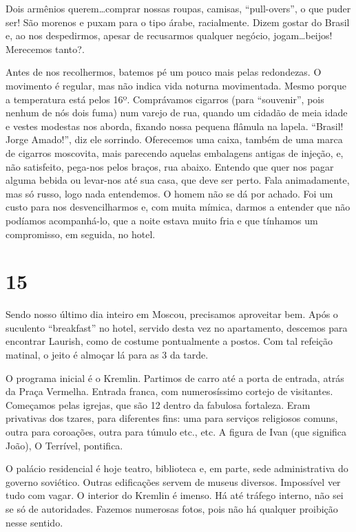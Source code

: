 Dois armênios querem\ldots comprar nossas roupas, camisas, ``pull-overs'', o que puder ser! São morenos e puxam para o tipo árabe, racialmente. Dizem gostar do Brasil e, ao nos despedirmos, apesar de recusarmos qualquer negócio, jogam\ldots beijos! Merecemos tanto?.

Antes de nos recolhermos, batemos pé um pouco mais pelas redondezas. O movimento é regular, mas não indica vida noturna movimentada. Mesmo porque a temperatura está pelos 16º. Comprávamos cigarros (para ``souvenir'', pois nenhum de nós dois fuma) num varejo de rua, quando um cidadão de meia idade e vestes modestas nos aborda, fixando nossa pequena flâmula na lapela. ``Brasil! Jorge Amado!'', diz ele sorrindo. Oferecemos uma caixa, também de uma marca de cigarros moscovita, mais parecendo aquelas embalagens antigas de injeção, e, não satisfeito, pega-nos pelos braços, rua abaixo. Entendo que quer nos pagar alguma bebida ou levar-nos até sua casa, que deve ser perto. Fala animadamente, mas só russo, logo nada entendemos. O homem não se dá por achado. Foi um custo para nos desvencilharmos e, com muita mímica, darmos a entender que não podíamos acompanhá-lo, que a noite estava muito fria e que tínhamos um compromisso, em seguida, no hotel.

\section*{15 \adfflatleafright {}}
Sendo nosso último dia inteiro em Moscou, precisamos aproveitar bem. Após o suculento ``breakfast'' no hotel, servido desta vez no apartamento, descemos para encontrar Laurish, como de costume pontualmente a postos. Com tal refeição matinal, o jeito é almoçar lá para as 3 da tarde.

O programa inicial é o Kremlin. Partimos de carro até a porta de entrada, atrás da Praça Vermelha. Entrada franca, com numerosíssimo cortejo de visitantes. Começamos pelas igrejas, que são 12 dentro da fabulosa fortaleza. Eram privativas dos tzares, para diferentes fins: uma para serviços religiosos comuns, outra para coroações, outra para túmulo etc., etc. A figura de Ivan (que significa João), O Terrível, pontifica.

O palácio residencial é hoje teatro, biblioteca e, em parte, sede administrativa do governo soviético. Outras edificações servem de museus diversos. Impossível ver tudo com vagar. O interior do Kremlin é imenso. Há até tráfego interno, não sei se só de autoridades. Fazemos numerosas fotos, pois não há qualquer proibição nesse sentido.

